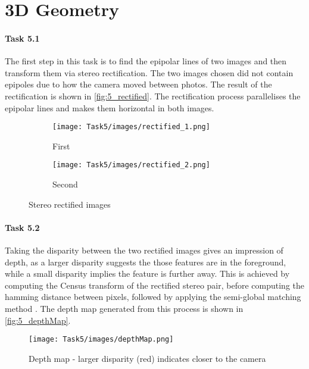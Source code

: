 \section{3D Geometry}

\paragraph{Task 5.1} The first step in this task is to find the epipolar lines of two images and then transform them via stereo rectification. The two images chosen did not contain epipoles due to how the camera moved between photos. The result of the rectification is shown in \autoref{fig:5_rectified}. The rectification process parallelises the epipolar lines and makes them horizontal in both images.

\begin{figure}
   \centering
   \begin{subfigure}{0.49\linewidth}
       \centering
       \texttt{[image: Task5/images/rectified\_1.png]}
       \caption{First}
       \label{subfig:5_rectified:1}
   \end{subfigure}
   \begin{subfigure}{0.49\linewidth}
       \centering
       \texttt{[image: Task5/images/rectified\_2.png]}
       \caption{Second}
       \label{subfig:5_rectified:2}
   \end{subfigure}
   \caption{Stereo rectified images}
   \label{fig:5_rectified}
\end{figure}

\paragraph{Task 5.2} Taking the disparity between the two rectified images gives an impression of depth, as a larger disparity suggests the those features are in the foreground, while a small disparity implies the feature is further away. This is achieved by computing the Census transform of the rectified stereo pair, before computing the hamming distance between pixels, followed by applying the semi-global matching method \cite{disparity_matlab}. The depth map generated from this process is shown in \autoref{fig:5_depthMap}.

\begin{figure}
   \centering
   \texttt{[image: Task5/images/depthMap.png]}
   \caption{Depth map - larger disparity (red) indicates closer to the camera}
   \label{fig:5_depthMap}
\end{figure}